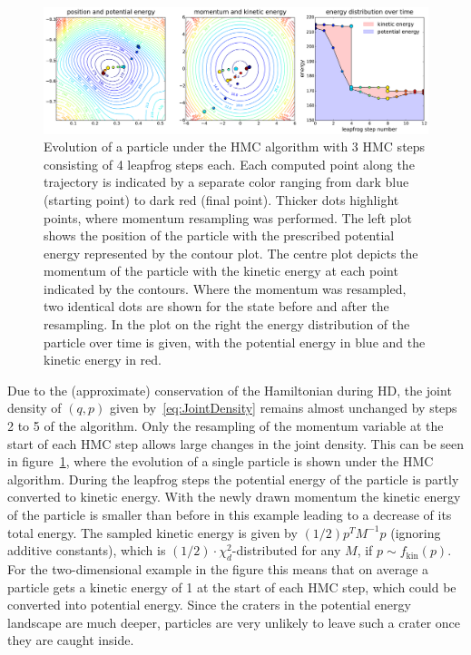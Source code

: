 \begin{figure}[t]
\centering
\includegraphics[width=2.05\columnwidth]{figures/hmc_motion_3hmc_04lf.pdf}
\caption{Evolution of a particle under the HMC algorithm with 3 HMC steps consisting of 4 leapfrog steps each. Each computed point along the trajectory is indicated by a separate color ranging from dark blue (starting point) to dark red (final point). Thicker dots highlight points, where momentum resampling was performed. The left plot shows the position of the particle with the prescribed potential energy represented by the contour plot. The centre plot depicts the momentum of the particle with the kinetic energy at each point indicated by the contours. Where the momentum was resampled, two identical dots are shown for the state before and after the resampling. In the plot on the right the energy distribution of the particle over time is given, with the potential energy in blue and the kinetic energy in red.}
\label{fig:HMC_MOTION_3hmc_04lf}
\end{figure}

Due to the (approximate) conservation of the Hamiltonian during HD, the joint density of $(q,p)$ given by~\eqref{eq:JointDensity} remains almost unchanged by steps 2 to 5 of the algorithm. Only the resampling of the momentum variable at the start of each HMC step allows large changes in the joint density. This can be seen in figure~\ref{fig:HMC_MOTION_3hmc_04lf}, where the evolution of a single particle is shown under the HMC algorithm. During the leapfrog steps the potential energy of the particle is partly converted to kinetic energy. With the newly drawn momentum the kinetic energy of the particle is smaller than before in this example leading to a decrease of its total energy. The sampled kinetic energy is given by $(1/2) p^T M^{-1} p$ (ignoring additive constants), which is $(1/2) \cdot \chi^2_d$-distributed for any $M$, if $p \sim f_\textrm{kin}(p)$. For the two-dimensional example in the figure this means that on average a particle gets a kinetic energy of 1 at the start of each HMC step, which could be converted into potential energy. Since the craters in the potential energy landscape are much deeper, particles are very unlikely to leave such a crater once they are caught inside.


